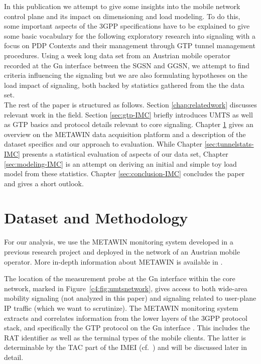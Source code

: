 In this publication we attempt to give some insights into the mobile network control plane and its impact on dimensioning and load modeling. To do this, some important aspects of the \ac{3GPP} specifications have to be explained to give some basic vocabulary for the following exploratory research into signaling with a focus on \ac{PDP} Contexts and their management through \ac{GTP} tunnel management procedures. Using a week long data set from an Austrian mobile operator recorded at the Gn interface between the \ac{SGSN} and \ac{GGSN}, we attempt to find criteria influencing the signaling but we are also formulating hypotheses on the load impact of signaling, both backed by statistics gathered from the the data set.\\

The rest of the paper is structured as follows. Section \ref{chap:relatedwork} discusses relevant work in the field. Section \ref{sec:gtp-IMC} briefly introduces \ac{UMTS} as well as \ac{GTP} basics and protocol details relevant to core signaling. Chapter \ref{sec:darwin-IMC} gives an overview on the \acs{METAWIN} data acquisition platform and a description of the dataset specifics and our approach to evaluation. While Chapter \ref{sec:tunnelstats-IMC} presents a statistical evaluation of aspects of our data set, Chapter \ref{sec:modeling-IMC} is an attempt on deriving an initial and simple toy load model from these statistics. Chapter \ref{sec:conclusion-IMC} concludes the paper and gives a short outlook.



\section{Dataset and Methodology}
\label{sec:darwin-IMC}

For our analysis, we use the \ac{METAWIN} monitoring system developed in a previous research project and deployed in the network of an Austrian mobile operator.  More in-depth information about \ac{METAWIN} is available in \cite{ricciato_2011}.

 The location of the measurement probe at the Gn interface within the core network, marked in Figure~\ref{c4:fig:umtsnetwork}, gives access to both wide-area mobility signaling (not analyzed in this paper) and signaling related to user-plane IP traffic (which we want to scrutinize). The \ac{METAWIN} monitoring system extracts and correlates information from the lower layers of the \ac{3GPP} protocol stack, and specifically the \ac{GTP} protocol on the Gn interface \cite{3gpp129.060}. This includes the \acf{RAT} identifier as well as the terminal types of the mobile clients. The latter is determinable by the \acf{TAC} part of the \acf{IMEI} (cf.~\cite{3gpp23.003}) and will be discussed later in detail.

